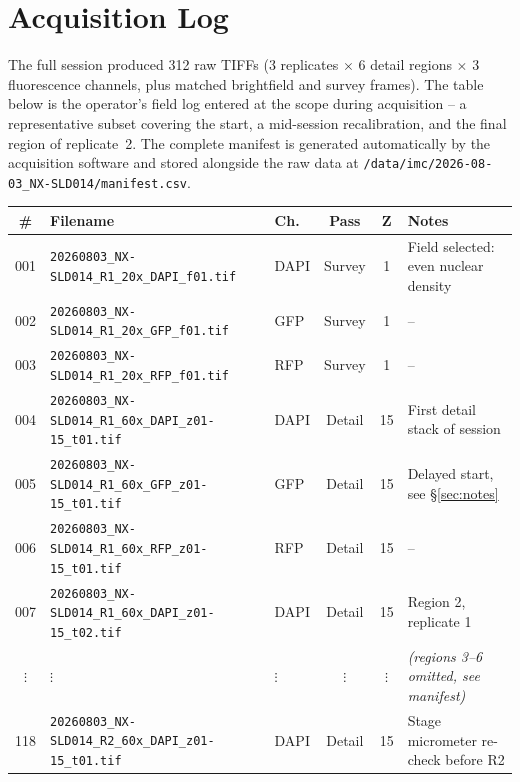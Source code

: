 \section{Acquisition Log}
\label{sec:acqlog}

The full session produced 312 raw TIFFs (3 replicates $\times$ 6 detail regions
$\times$ 3 fluorescence channels, plus matched brightfield and survey frames).
The table below is the operator's field log entered at the scope during
acquisition -- a representative subset covering the start, a mid-session
recalibration, and the final region of replicate~2. The complete manifest is
generated automatically by the acquisition software and stored alongside the
raw data at \texttt{/data/imc/2026-08-03\_NX-SLD014/manifest.csv}.

\begin{center}
\renewcommand{\arraystretch}{1.3}
\begin{tabularx}{\linewidth}{@{}c l l c c X@{}}
\toprule
\rowcolor{inkslate}
\textcolor{paperwhite}{\textbf{\#}} & \textcolor{paperwhite}{\textbf{Filename}} &
\textcolor{paperwhite}{\textbf{Ch.}} & \textcolor{paperwhite}{\textbf{Pass}} &
\textcolor{paperwhite}{\textbf{Z}} & \textcolor{paperwhite}{\textbf{Notes}} \\
\midrule
001 & \texttt{20260803\_NX-SLD014\_R1\_20x\_DAPI\_f01.tif} & DAPI & Survey & 1  & Field selected: even nuclear density \\
002 & \texttt{20260803\_NX-SLD014\_R1\_20x\_GFP\_f01.tif}  & GFP  & Survey & 1  & -- \\
003 & \texttt{20260803\_NX-SLD014\_R1\_20x\_RFP\_f01.tif}  & RFP  & Survey & 1  & -- \\
\rowcolor{mistgray}
004 & \texttt{20260803\_NX-SLD014\_R1\_60x\_DAPI\_z01-15\_t01.tif} & DAPI & Detail & 15 & First detail stack of session \\
005 & \texttt{20260803\_NX-SLD014\_R1\_60x\_GFP\_z01-15\_t01.tif}  & GFP  & Detail & 15 & Delayed start, see \S\ref{sec:notes} \\
006 & \texttt{20260803\_NX-SLD014\_R1\_60x\_RFP\_z01-15\_t01.tif}  & RFP  & Detail & 15 & -- \\
\rowcolor{mistgray}
007 & \texttt{20260803\_NX-SLD014\_R1\_60x\_DAPI\_z01-15\_t02.tif} & DAPI & Detail & 15 & Region 2, replicate 1 \\
$\vdots$ & $\vdots$ & $\vdots$ & $\vdots$ & $\vdots$ & \textit{(regions 3--6 omitted, see manifest)} \\
118 & \texttt{20260803\_NX-SLD014\_R2\_60x\_DAPI\_z01-15\_t01.tif} & DAPI & Detail & 15 & Stage micrometer re-check before R2 \\

\end{tabularx}
\end{center}
